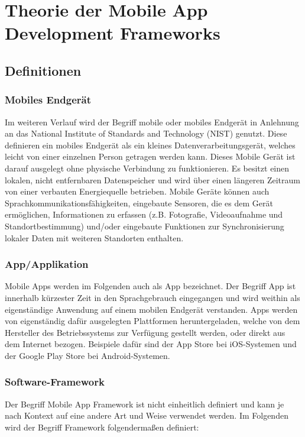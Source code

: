 \chapter{Theorie der \glqq Mobile App Development Frameworks\grqq}

\section{Definitionen}

\subsection{Mobiles Endgerät}

Im weiteren Verlauf wird der Begriff mobile oder mobiles Endgerät in Anlehnung an das National Institute of Standards and Technology (NIST) genutzt. Diese definieren ein mobiles Endgerät als ein kleines Datenverarbeitungsgerät, welches leicht von einer einzelnen Person getragen werden kann. Dieses Mobile Gerät ist darauf ausgelegt ohne physische Verbindung zu funktionieren. Es besitzt einen lokalen, nicht entfernbaren Datenspeicher und wird über einen längeren Zeitraum von einer verbauten Energiequelle betrieben. Mobile Geräte können auch Sprachkommunikationsfähigkeiten, eingebaute Sensoren, die es dem Gerät ermöglichen, Informationen zu erfassen (z.B. Fotografie, Videoaufnahme und Standortbestimmung) und/oder eingebaute Funktionen zur Synchronisierung lokaler Daten mit weiteren Standorten enthalten\cite{nist1}.

\subsection{App/Applikation}

Mobile Apps werden im Folgenden auch als App bezeichnet. Der Begriff App ist innerhalb kürzester Zeit in den Sprachgebrauch eingegangen und wird weithin als eigenständige Anwendung auf einem mobilen Endgerät verstanden.
Apps werden von eigenständig dafür ausgelegten Plattformen heruntergeladen, welche von dem Hersteller des Betriebssystems zur Verfügung gestellt werden, oder direkt aus dem Internet bezogen.
Beispiele dafür sind der App Store bei iOS-Systemen und der Google Play Store bei Android-Systemen\cite{heikGrundl}.
\newpage
\subsection{Software-Framework}

Der Begriff Mobile App Framework ist nicht einheitlich definiert und kann je nach Kontext auf eine andere Art und Weise verwendet werden. Im Folgenden wird der Begriff Framework folgendermaßen definiert: \\

